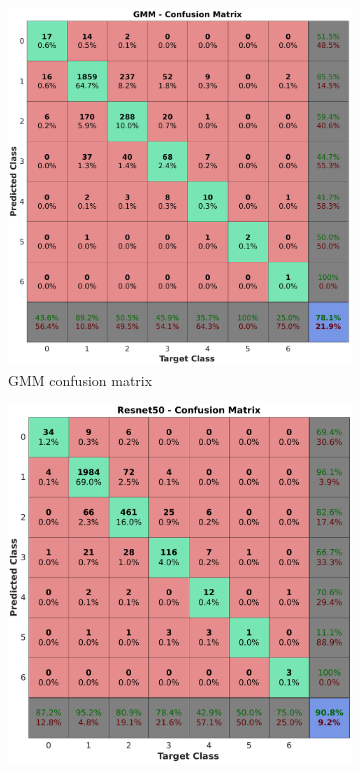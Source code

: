 \begin{figure}[!htbp]
    \centering
    \begin{subfigure}[b]{0.46\textwidth}
    \centering
    \includegraphics[width=\textwidth]{figures/counting/gmm_confmat.pdf}%
    \caption{GMM confusion matrix}
    \end{subfigure}
    \quad \begin{subfigure}[b]{0.46\textwidth}
    \centering
    \includegraphics[width=\textwidth]{figures/counting/resnet_confmat.pdf}%

\end{subfigure}
\end{figure}
